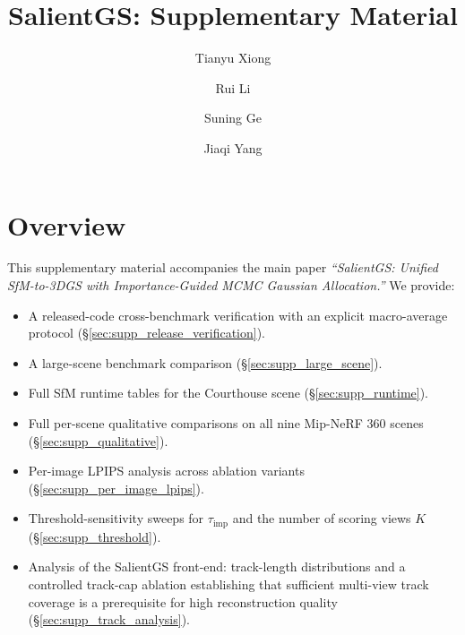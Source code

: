 \documentclass[sigconf]{acmart}
\begin{document}
\setlength{\emergencystretch}{2em}

\title{SalientGS: Supplementary Material}

\author{Tianyu Xiong}
\author{Rui Li}
\author{Suning Ge}
\author{Jiaqi Yang}

\renewcommand{\shortauthors}{T. Xiong et al.}

\maketitle

\section{Overview}

This supplementary material accompanies the main paper \emph{``SalientGS: Unified SfM-to-3DGS with Importance-Guided MCMC Gaussian Allocation.''}
We provide:
\begin{itemize}
    \item A released-code cross-benchmark verification with an explicit macro-average protocol (\S\ref{sec:supp_release_verification}).
    \item A large-scene benchmark comparison (\S\ref{sec:supp_large_scene}).
    \item Full SfM runtime tables for the Courthouse scene (\S\ref{sec:supp_runtime}).
    \item Full per-scene qualitative comparisons on all nine Mip-NeRF 360 scenes (\S\ref{sec:supp_qualitative}).
    \item Per-image LPIPS analysis across ablation variants (\S\ref{sec:supp_per_image_lpips}).
    \item Threshold-sensitivity sweeps for $\tau_{\text{imp}}$ and the number of scoring views $K$ (\S\ref{sec:supp_threshold}).
    \item Analysis of the SalientGS front-end: track-length distributions and a controlled track-cap ablation establishing that sufficient multi-view track coverage is a prerequisite for high reconstruction quality (\S\ref{sec:supp_track_analysis}).
\end{itemize}
\end{document}

